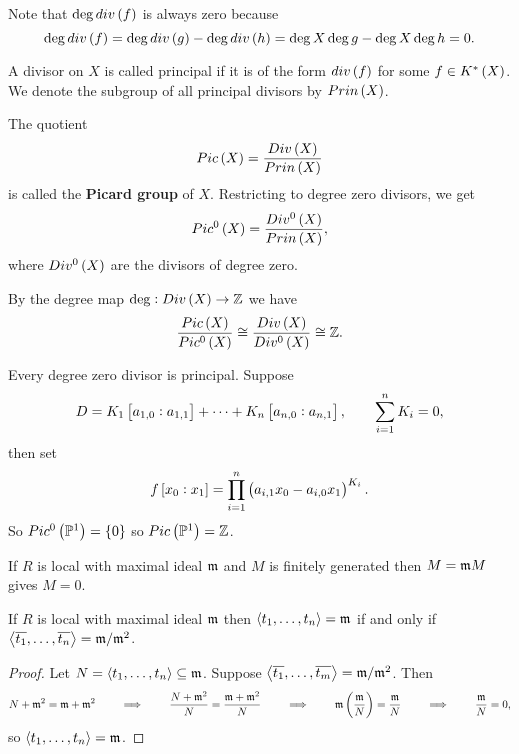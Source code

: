\begin{remark}
Note that $ \deg div\br{f} $ is always zero because
$$ \deg div\br{f} = \deg div\br{g} - \deg div\br{h} = \deg X\deg g - \deg X\deg h = 0. $$
\end{remark}

\begin{definition}
A divisor on $ X $ is called principal if it is of the form $ div\br{f} $ for some $ f \in K^*\br{X} $. We denote the subgroup of all principal divisors by $ Prin\br{X} $.
\end{definition}

\begin{definition}
The quotient
$$ Pic\br{X} = \dfrac{Div\br{X}}{Prin\br{X}} $$
is called the \textbf{Picard group} of $ X $. Restricting to degree zero divisors, we get
$$ Pic^0\br{X} = \dfrac{Div^0\br{X}}{Prin\br{X}}, $$
where $ Div^0\br{X} $ are the divisors of degree zero.
\end{definition}

By the degree map $ \deg : Div\br{X} \to \ZZ $ we have
$$ \dfrac{Pic\br{X}}{Pic^0\br{X}} \cong \dfrac{Div\br{X}}{Div^0\br{X}} \cong \ZZ. $$

\pagebreak

\begin{example}
Every degree zero divisor is principal. Suppose
$$ D = K_1\sbr{a_{1, 0} : a_{1, 1}} + \dots + K_n\sbr{a_{n, 0} : a_{n, 1}}, \qquad \sum_{i = 1}^n K_i = 0, $$
then set
$$ f\sbr{x_0 : x_1} = \prod_{i = 1}^n \br{a_{i, 1}x_0 - a_{i, 0}x_1}^{K_i}. $$
So $ Pic^0\br{\PP^1} = \cbr{0} $ so $ Pic\br{\PP^1} = \ZZ $.
\end{example}


\begin{lemma}
If $ R $ is local with maximal ideal $ \mathfrak{m} $ and $ M $ is finitely generated then $ M = \mathfrak{m} M $ gives $ M = 0 $.
\end{lemma}

\begin{corollary}
If $ R $ is local with maximal ideal $ \mathfrak{m} $ then $ \left\langle t_1, \dots, t_n \right\rangle = \mathfrak{m} $ if and only if $ \left\langle \overline{t_1}, \dots, \overline{t_n} \right\rangle = \mathfrak{m} / \mathfrak{m}^2 $.
\end{corollary}

\begin{proof}
Let $ N = \left\langle t_1, \dots, t_n \right\rangle \subseteq \mathfrak{m} $. Suppose $ \left\langle \overline{t_1}, \dots, \overline{t_m} \right\rangle = \mathfrak{m} / \mathfrak{m}^2 $. Then
$$ N + \mmm^2 = \mmm + \mmm^2 \qquad \implies \qquad \dfrac{N + \mmm^2}{N} = \dfrac{\mmm + \mmm^2}{N} \qquad \implies \qquad \mmm\br{\dfrac{\mmm}{N}} = \dfrac{\mmm}{N} \qquad \implies \qquad \dfrac{\mmm}{N} = 0, $$
so $ \left\langle t_1, \dots, t_n \right\rangle = \mathfrak{m} $.
\end{proof}

